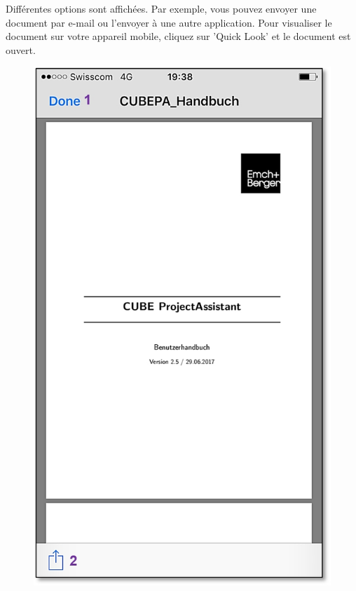 Différentes options sont affichées. Par exemple, vous pouvez envoyer une document par e-mail ou l'envoyer à une autre application. Pour visualiser le document sur votre appareil mobile, cliquez sur 'Quick Look' et le document est ouvert.

\vspace{9.5cm}

\begin{figure}   %
  \vspace{-35pt}      %
  \begin{center}
    \includegraphics[width=1\linewidth]{../chapters/11_Dokumentenablage/pictures/11-mob07_Dokument_lesen_teilen.jpg}
  \end{center}
  \vspace{-20pt}
  \vspace{-10pt}
\end{figure}

